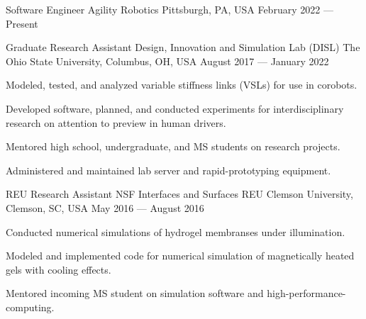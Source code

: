 

\begin{cventries}
  \cventry
    {Software Engineer} %
    {Agility Robotics} %
    {Pittsburgh, PA, USA} %
    {February 2022 --- Present} %
    {
      \begin{cvitems} %
        \item{}
      \end{cvitems}
    }

  \cventry
    {Graduate Research Assistant} %
    {Design, Innovation and Simulation Lab (DISL)} %
    {The Ohio State University, Columbus, OH, USA} %
    {August 2017 --- January 2022} %
    {
      \begin{cvitems} %
        \item{Modeled, tested, and analyzed variable stiffness links (VSLs) for use in corobots.}
        \item{Developed software, planned, and conducted experiments for interdisciplinary research on attention to preview in human drivers.}
        \item{Mentored high school, undergraduate, and MS students on research projects.}
        \item{Administered and maintained lab server and rapid-prototyping equipment.}
      \end{cvitems}
    }

  \cventry
    {REU Research Assistant} %
    {NSF Interfaces and Surfaces REU} %
    {Clemson University, Clemson, SC, USA} %
    {May 2016 --- August 2016} %
    {
      \begin{cvitems} %
        \item {Conducted numerical simulations of hydrogel membranses under illumination.}
        \item {Modeled and implemented code for numerical simulation of magnetically heated gels with cooling effects.}
        \item {Mentored incoming MS student on simulation software and high-performance-computing.}
      \end{cvitems}
    }


\end{cventries}
